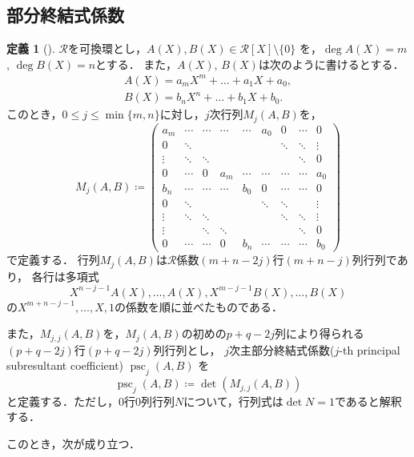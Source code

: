 \documentclass[uplatex, dvipdfmx]{jsarticle}
\numberwithin{equation}{section}
\DeclareMathOperator{\psc}{psc}
\theoremstyle{definition}
\newtheorem{definition}{定義}[section]
\begin{document}
\subsection{部分終結式係数}
\begin{definition}[{\cite[Section 2]{MR0403962}}]
     $\mathcal{R}$を可換環とし，$A(X), B(X) \in \mathcal{R}[X] \setminus \{0\}$ を，$\deg A(X) = m$, $\deg B(X) = n$とする．
     また，$A(X)$, $B(X)$は次のように書けるとする．
     \begin{align}
          A(X) = a_m X^m + \dots + a_1 X + a_0, \\
          B(X) = b_n X^n + \dots + b_1 X + b_0.
     \end{align}
     このとき，$0 \leq j \leq \min\{m, n\}$に対し，$j$次行列$M_j(A, B)$を，
     \begin{equation}
          M_j(A, B) \coloneqq
          \begin{pmatrix}
               a_m    & \cdots & \cdots & \cdots & \cdots & a_0    & 0      & \cdots & 0      \\
               0      & \ddots &        &        &        &        & \ddots & \ddots & \vdots \\
               \vdots & \ddots & \ddots &        &        &        &        & \ddots & 0      \\
               0      & \cdots & 0      & a_m    & \cdots & \cdots & \cdots & \cdots & a_0    \\
               b_n    & \cdots & \cdots & \cdots & b_0    & 0      & \cdots & \cdots & 0      \\
               0      & \ddots &        &        &        & \ddots & \ddots &        & \vdots \\
               \vdots & \ddots & \ddots &        &        &        & \ddots & \ddots & \vdots \\
               \vdots &        & \ddots & \ddots &        &        &        & \ddots & 0      \\
               0      & \cdots & \cdots & 0      & b_n    & \cdots & \cdots & \cdots & b_0      
          \end{pmatrix}
     \end{equation}
     で定義する．
     行列$M_j(A,B)$は$\mathcal{R}$係数$(m+n-2j)$行$(m+n-j)$列行列であり，
     各行は多項式
     \begin{equation}
          X^{n-j-1}A(X), \dots, A(X), X^{m-j-1}B(X), \dots, B(X)
     \end{equation}
     の$X^{m+n-j-1}, \dots, X, 1$の係数を順に並べたものである．

     また，$M_{j,j}(A,B)$を，$M_j(A,B)$の初めの$p+q-2j$列により得られる$(p+q-2j)$行$(p+q-2j)$列行列とし，
     $j$次主部分終結式係数($j$-th principal subresultant coefficient) $\psc_j(A,B)$ を
     \begin{equation}
          \psc_j(A,B) \coloneqq \det(M_{j,j}(A,B))
     \end{equation}
     と定義する．ただし，$0$行$0$列行列$N$について，行列式は$\det N = 1$であると解釈する．
\end{definition}
このとき，次が成り立つ．
\end{document}
